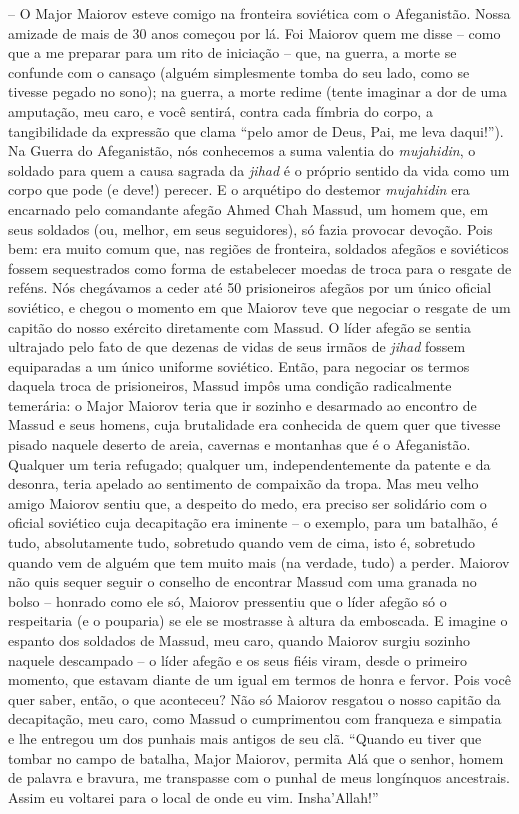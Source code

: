 -- O Major Maiorov esteve comigo na fronteira soviética com o
Afeganistão. Nossa amizade de mais de 30 anos começou por lá. Foi
Maiorov quem me disse -- como que a me preparar para um rito de
iniciação -- que, na guerra, a morte se confunde com o cansaço (alguém
simplesmente tomba do seu lado, como se tivesse pegado no sono); na
guerra, a morte redime (tente imaginar a dor de uma amputação, meu caro,
e você sentirá, contra cada fímbria do corpo, a tangibilidade da
expressão que clama ``pelo amor de Deus, Pai, me leva daqui!''). Na
Guerra do Afeganistão, nós conhecemos a suma valentia do
\emph{mujahidin}, o soldado para quem a causa sagrada da \emph{jihad} é
o próprio sentido da vida como um corpo que pode (e deve!) perecer. E o
arquétipo do destemor \emph{mujahidin} era encarnado pelo comandante
afegão Ahmed Chah Massud, um homem que, em seus soldados (ou, melhor, em
seus seguidores), só fazia provocar devoção. Pois bem: era muito comum
que, nas regiões de fronteira, soldados afegãos e soviéticos fossem
sequestrados como forma de estabelecer moedas de troca para o resgate de
reféns. Nós chegávamos a ceder até 50 prisioneiros afegãos por um único
oficial soviético, e chegou o momento em que Maiorov teve que negociar o
resgate de um capitão do nosso exército diretamente com Massud. O líder
afegão se sentia ultrajado pelo fato de que dezenas de vidas de seus
irmãos de \emph{jihad} fossem equiparadas a um único uniforme soviético.
Então, para negociar os termos daquela troca de prisioneiros, Massud
impôs uma condição radicalmente temerária: o Major Maiorov teria que ir
sozinho e desarmado ao encontro de Massud e seus homens, cuja
brutalidade era conhecida de quem quer que tivesse pisado naquele
deserto de areia, cavernas e montanhas que é o Afeganistão. Qualquer um
teria refugado; qualquer um, independentemente da patente e da desonra,
teria apelado ao sentimento de compaixão da tropa. Mas meu velho amigo
Maiorov sentiu que, a despeito do medo, era preciso ser solidário com o
oficial soviético cuja decapitação era iminente -- o exemplo, para um
batalhão, é tudo, absolutamente tudo, sobretudo quando vem de cima, isto
é, sobretudo quando vem de alguém que tem muito mais (na verdade, tudo)
a perder. Maiorov não quis sequer seguir o conselho de encontrar Massud
com uma granada no bolso -- honrado como ele só, Maiorov pressentiu que
o líder afegão só o respeitaria (e o pouparia) se ele se mostrasse à
altura da emboscada. E imagine o espanto dos soldados de Massud, meu
caro, quando Maiorov surgiu sozinho naquele descampado -- o líder afegão
e os seus fiéis viram, desde o primeiro momento, que estavam diante de
um igual em termos de honra e fervor. Pois você quer saber, então, o que
aconteceu? Não só Maiorov resgatou o nosso capitão da decapitação, meu
caro, como Massud o cumprimentou com franqueza e simpatia e lhe entregou
um dos punhais mais antigos de seu clã. ``Quando eu tiver que tombar no
campo de batalha, Major Maiorov, permita Alá que o senhor, homem de
palavra e bravura, me transpasse com o punhal de meus longínquos
ancestrais. Assim eu voltarei para o local de onde eu vim.
Insha'Allah!''

